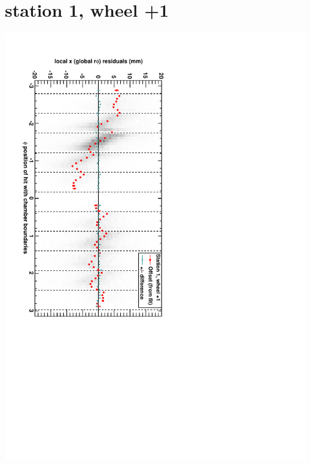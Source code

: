 \documentclass[compress]{beamer}
\begin{document}
\section*{station 1, wheel +1}
\begin{frame} \vfill \mbox{\hspace{-1 cm}\includegraphics[height=1.2\linewidth, angle=90]{DTrphiVsPhi_st1_whD.pdf}} \end{frame}
\end{document}
